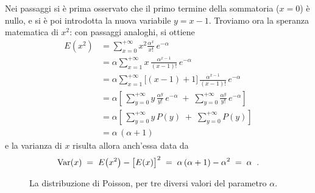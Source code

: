 Nei passaggi si \`e prima osservato che il primo termine
della sommatoria ($x = 0$) \`e nullo, e si \`e poi
introdotta la nuova variabile $y = x - 1$.  Troviamo ora la
speranza matematica di $x^2$: con passaggi analoghi, si
ottiene
\begin{align*}
  E(x^2) &= \sum_{x=0}^{+ \infty} x^2
    \frac{\alpha^x}{x!} \, e^{-\alpha} \\[1ex]
  &= \alpha \sum_{x=1}^{+ \infty} x \,
    \frac{\alpha^{x-1}}{(x-1)!}
    \, e^{-\alpha} \\[1ex]
  &= \alpha \sum_{x=1}^{+ \infty}
    \bigl[ (x-1)+1 \bigr]
    \, \frac{\alpha^{x-1}}{(x-1)!} \, e^{-\alpha}
    \\[1ex]
  &= \alpha \left[ \,
    \sum_{y=0}^{+ \infty} y \,
    \frac{\alpha^y}{y!} \, e^{-\alpha} \; + \;
    \sum_{y=0}^{+ \infty} \frac{\alpha^y}{y!} \,
    e^{-\alpha} \right] \\[1ex]
  &= \alpha \left[ \,
    \sum_{y=0}^{+ \infty} y \, P(y) \; + \;
    \sum_{y=0}^{+ \infty} P(y) \right] \\[1ex]
  &= \alpha \, (\alpha + 1)
\end{align*}
e la varianza di $x$ risulta allora anch'essa data da
\begin{equation*}
  \operatorname{Var} (x) \; = \;
    E \bigl( x^2 \bigr) - \bigl[ E(x) \bigr]^2
    \; = \; \alpha \, (\alpha+1) - \alpha^2 \; = \;
    \alpha \;\; .
\end{equation*}
\begin{figure}[hbtp]
  \vspace*{2ex}
  \begin{center} {
    
  } \end{center}
  \caption[La distribuzione di Poisson]
    {La distribuzione di
    Poisson, per tre diversi valori del parametro
    $\alpha$.}
  \label{fig:8.poissn}
\end{figure}

